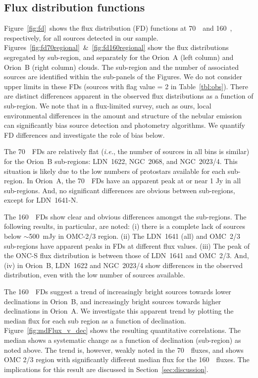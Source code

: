 \documentclass[manuscript]{aastex61}
\newcommand{\ie}{{\em i.e.}}
\begin{document}
\subsection{Flux distribution functions}
\label{lfs}
\par
Figure~\ref{fig:fd}\ shows the flux distribution (FD) functions at 70~\micron\ and 160~\micron, respectively, for all sources detected in our sample.  Figures~\ref{fig:fd70regional}~\&~\ref{fig:fd160regional} show the flux distributions segregated by sub-region, and separately for the Orion~A (left column) and Orion~B (right column) clouds.  The sub-region and the number of associated sources are identified within the sub-panels of the Figures.  We do not consider upper limits in these FDs (sources with flag value = 2 in Table~\ref{tbl:obs}). There are distinct differences apparent in the observed flux distributions as a function of sub-region.  We note that in a flux-limited survey, such as ours, local environmental differences in the amount and structure of the nebular emission can significantly bias source detection and photometry algorithms.  We quantify FD differences and investigate the role of bias below.
\par
The 70~\micron\ FDs are relatively flat (\ie, the number of sources in all bins is similar) for the Orion~B sub-regions: LDN~1622, NGC~2068, and NGC~2023/4.  This situation is likely due to the low numbers of protostars available for each sub-region.  In Orion~A, the 70~\micron\ FDs have an apparent peak at or near 1 Jy in all sub-regions.  And, no significant differences are obvious between sub-regions, except for LDN~1641-N.
\par
The 160~\micron\ FDs show clear and obvious differences amongst the sub-regions.  The following results, in particular, are noted: (i) there is a complete lack of sources below $\sim$500~mJy in OMC-2/3 region.  (ii) The LDN~1641 (all) and OMC~2/3 sub-regions have apparent peaks in FDs at different flux values.  (iii) The peak of the ONC-S flux distribution is between those of LDN~1641 and OMC~2/3.  And, (iv) in Orion~B, LDN~1622 and NGC~2023/4 show differences in the observed distribution, even with the low number of sources available.
\par
The 160~\micron\ FDs suggest a trend of increasingly bright sources towards lower declinations in Orion~B, and increasingly bright sources towards higher declinations in Orion~A.  We investigate this apparent trend by plotting the median flux for each sub region as a function of declination.  Figure~\ref{fig:mdFlux_v_dec} shows the resulting quantitative correlations.  The median shows a systematic change as a function of declination (sub-region) as noted above.  The trend is, however, weakly noted in the 70~\micron\ fluxes, and shows OMC 2/3 region with significantly different median flux for the 160~\micron\ fluxes.  The implications for this result are discussed in Section~\ref{sec:discussion}.
\end{document}
